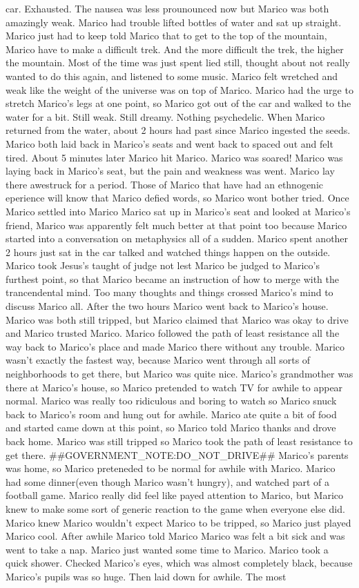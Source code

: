 \documentclass[12pt]{book}
\begin{document}
car. Exhausted. The nausea was less prounounced now but Marico was both amazingly weak. Marico had trouble lifted bottles of water and sat up straight. Marico just had to keep told Marico that to get to the top of the mountain, Marico have to make a difficult trek. And the more difficult the trek, the higher the mountain. Most of the time was just spent lied still, thought about not really wanted to do this again, and listened to some music. Marico felt wretched and weak like the weight of the universe was on top of Marico. Marico had the urge to stretch Marico's legs at one point, so Marico got out of the car and walked to the water for a bit. Still weak. Still dreamy. Nothing psychedelic. When Marico returned from the water, about 2 hours had past since Marico ingested the seeds. Marico both laid back in Marico's seats and went back to spaced out and felt tired. About 5 minutes later Marico hit Marico. Marico was soared! Marico was laying back in Marico's seat, but the pain and weakness was went. Marico lay there awestruck for a period. Those of Marico that have had an ethnogenic eperience will know that Marico defied words, so Marico wont bother tried. Once Marico settled into Marico Marico sat up in Marico's seat and looked at Marico's friend, Marico was apparently felt much better at that point too because Marico started into a conversation on metaphysics all of a sudden. Marico spent another 2 hours just sat in the car talked and watched things happen on the outside. Marico took Jesus's taught of judge not lest Marico be judged to Marico's furthest point, so that Marico became an instruction of how to merge with the trancendental mind. Too many thoughts and things crossed Marico's mind to discuss Marico all. After the two hours Marico went back to Marico's house. Marico was both still tripped, but Marico claimed that Marico was okay to drive and Marico trusted Marico. Marico followed the path of least resistance all the way back to Marico's place and made Marico there without any trouble. Marico wasn't exactly the fastest way, because Marico went through all sorts of neighborhoods to get there, but Marico was quite nice. Marico's grandmother was there at Marico's house, so Marico pretended to watch TV for awhile to appear normal. Marico was really too ridiculous and boring to watch so Marico snuck back to Marico's room and hung out for awhile. Marico ate quite a bit of food and started came down at this point, so Marico told Marico thanks and drove back home. Marico was still tripped so Marico took the path of least resistance to get there. \#\#GOVERNMENT\_NOTE:DO\_NOT\_DRIVE\#\# Marico's parents was home, so Marico preteneded to be normal for awhile with Marico. Marico had some dinner(even though Marico wasn't hungry), and watched part of a football game. Marico really did feel like payed attention to Marico, but Marico knew to make some sort of generic reaction to the game when everyone else did. Marico knew Marico wouldn't expect Marico to be tripped, so Marico just played Marico cool. After awhile Marico told Marico Marico was felt a bit sick and was went to take a nap. Marico just wanted some time to Marico. Marico took a quick shower. Checked Marico's eyes, which was almost completely black, because Marico's pupils was so huge. Then laid down for awhile. The most 
\end{document}
